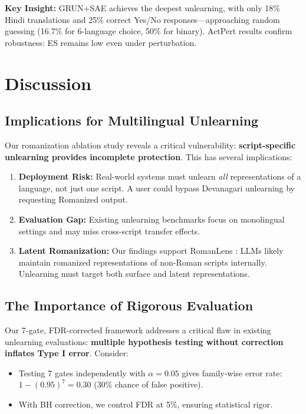 \documentclass[11pt]{article}
\begin{document}
\textbf{Key Insight:} GRUN+SAE achieves the deepest unlearning, with only 18\% Hindi translations and 25\% correct Yes/No responses—approaching random guessing (16.7\% for 6-language choice, 50\% for binary). ActPert results confirm robustness: ES remains low even under perturbation.

\section{Discussion}

\subsection{Implications for Multilingual Unlearning}

Our romanization ablation study reveals a critical vulnerability: \textbf{script-specific unlearning provides incomplete protection}. This has several implications:

\begin{enumerate}
    \item \textbf{Deployment Risk:} Real-world systems must unlearn \textit{all} representations of a language, not just one script. A user could bypass Devanagari unlearning by requesting Romanized output.

    \item \textbf{Evaluation Gap:} Existing unlearning benchmarks \cite{jia2024muse,maini2024tofu} focus on monolingual settings and may miss cross-script transfer effects.

    \item \textbf{Latent Romanization:} Our findings support RomanLens \cite{wendler2024romanlens}: LLMs likely maintain romanized representations of non-Roman scripts internally. Unlearning must target both surface and latent representations.
\end{enumerate}

\subsection{The Importance of Rigorous Evaluation}

Our 7-gate, FDR-corrected framework addresses a critical flaw in existing unlearning evaluations: \textbf{multiple hypothesis testing without correction inflates Type I error}. Consider:

\begin{itemize}
    \item Testing 7 gates independently with $\alpha=0.05$ gives family-wise error rate: $1 - (0.95)^7 = 0.30$ (30\% chance of false positive).
    \item With BH correction, we control FDR at 5\%, ensuring statistical rigor.
\end{itemize}
\end{document}
